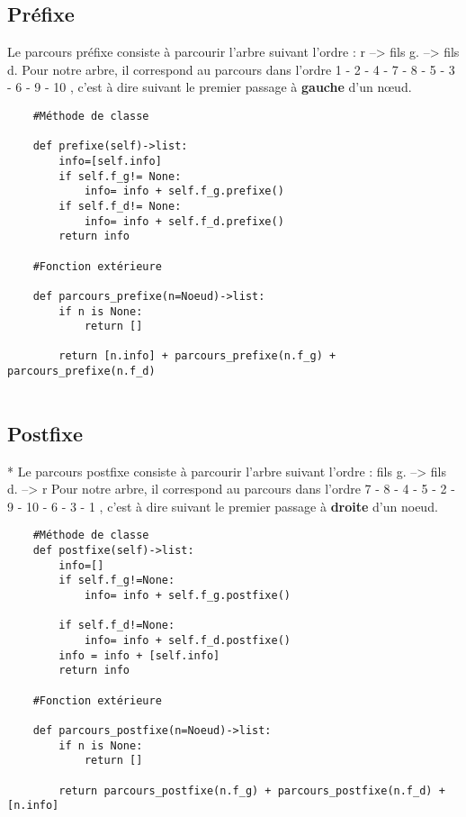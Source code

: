 \documentclass{article}
\begin{document}
\subsection{Préfixe}
Le parcours préfixe consiste à parcourir l'arbre suivant l'ordre : r --> fils g. --> fils d.
 Pour notre arbre, il correspond au parcours dans 
 l’ordre 1 - 2 - 4 - 7 - 8 - 5 - 3 - 6 - 9 - 10 , 
 c’est à dire suivant le premier passage à \textbf{gauche} d’un nœud.
\renewcommand{\theFancyVerbLine}{
  \sffamily\textcolor[rgb]{0.5,0.5,0.5}{\scriptsize\arabic{FancyVerbLine}}}

\begin{verbatim}
    #Méthode de classe

    def prefixe(self)->list:
        info=[self.info]
        if self.f_g!= None:
            info= info + self.f_g.prefixe()
        if self.f_d!= None:
            info= info + self.f_d.prefixe() 
        return info

    #Fonction extérieure

    def parcours_prefixe(n=Noeud)->list:
        if n is None:
            return []
        
        return [n.info] + parcours_prefixe(n.f_g) + parcours_prefixe(n.f_d)


\end{verbatim}
\subsection{Postfixe}*
Le parcours postfixe consiste à parcourir l'arbre suivant l'ordre : fils g. --> fils d. --> r
 Pour notre arbre, il correspond au parcours dans 
 l’ordre 7 - 8 - 4 - 5 - 2 - 9 - 10 - 6 - 3 - 1 ,
 c'est à dire suivant le premier passage à \textbf{droite} d'un noeud.

\renewcommand{\theFancyVerbLine}{
  \sffamily\textcolor[rgb]{0.5,0.5,0.5}{\scriptsize\arabic{FancyVerbLine}}}

\begin{verbatim}
    #Méthode de classe
    def postfixe(self)->list:
        info=[]
        if self.f_g!=None:
            info= info + self.f_g.postfixe()  
            
        if self.f_d!=None:
            info= info + self.f_d.postfixe()
        info = info + [self.info]
        return info

    #Fonction extérieure

    def parcours_postfixe(n=Noeud)->list:
        if n is None:
            return []
        
        return parcours_postfixe(n.f_g) + parcours_postfixe(n.f_d) + [n.info]
\end{verbatim}
\newpage
\end{document}
